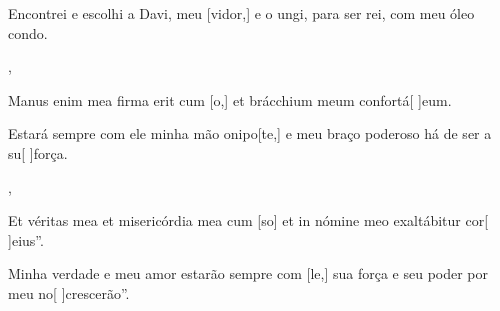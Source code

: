 {    {\item {}Encontrei e escolhi a Davi, meu [vidor,] e o ungi, para ser rei, com meu óleo condo.~\Responsorium},
  {\item {}Manus enim mea firma erit cum [o,] et brácchium meum confortá[ ]{e}um.~\Responsorium}%
    {\item {}Estará sempre com ele minha mão onipo[te,] e meu braço poderoso há de ser a su[ ]{for}ça.~\Responsorium},
  {\item {}Et véritas mea et misericórdia mea cum [so] et in nómine meo exaltábitur cor[ ]{e}ius''.~\Responsorium}%
    {\item {}Minha verdade e meu amor estarão sempre com [le,] sua força e seu poder por meu no[ ]{cres}cerão''.~\Responsorium}
}